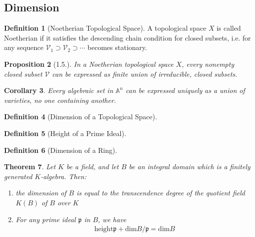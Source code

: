 \documentclass[11pt]{book}
\newtheorem{theorem}{Theorem}[section]
\newtheorem{proposition}[theorem]{Proposition}
\newtheorem{corollary}[theorem]{Corollary}
\theoremstyle{definition}
\newtheorem{definition}[theorem]{Definition}
\numberwithin{equation}{section}
\begin{document}
\subsection*{Dimension}
%
%
%
\begin{defbox}
    \begin{definition}[Noetherian Topological Space]
        A topological space \(X\) is called Noetherian if it satisfies the descending chain condition for closed subsets, i.e. for any sequence \(\mathcal{V}_1 \supset \mathcal{V}_2 \supset \cdots\) becomes stationary.
    \end{definition}
\end{defbox}
\begin{thmbox}
    \begin{proposition}[1.5.]
        In a Noetherian topological space \(X\), every nonempty closed subset \(\mathcal{V}\) can be expressed as finite union of irreducible, closed subsets.
    \end{proposition}
\end{thmbox}
\begin{thmbox}
    \begin{corollary}
        Every algebraic set in \(\mathbb{A}^n\) can be expressed uniquely as a union of varieties, no one containing another.
    \end{corollary}
\end{thmbox}
\begin{defbox}
    \begin{definition}[Dimension of a Topological Space]
        
    \end{definition}
\end{defbox}
\begin{defbox}
    \begin{definition}[Height of a Prime Ideal]
        
    \end{definition}
\end{defbox}
\begin{defbox}
    \begin{definition}[Dimension of a Ring]
        
    \end{definition}
\end{defbox}
\begin{thmbox}
    \begin{theorem}
        Let \(K\) be a field, and let \(B\) be an integral domain which is a finitely generated \(K\)-algebra. Then:
        \begin{enumerate}
            \item the dimension of \(B\) is equal to the transcendence degree of the quotient field \(K(B)\) of \(B\) over \(K\)
            \item For any prime ideal \(\mathfrak{p}\) in \(B\), we have
            \begin{align*}
                \text{height} \mathfrak{p} + \text{dim} B / \mathfrak{p} = \text{dim} B
            \end{align*}
        \end{enumerate}
    \end{theorem}
\end{thmbox}
\end{document}
